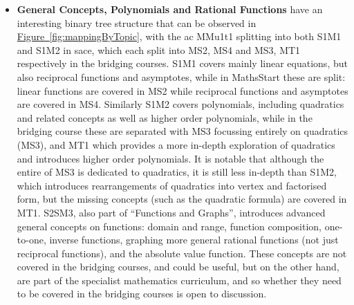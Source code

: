 \documentclass[twoside,12pt,a4paper]{report}
\newcommand{\reffig}[1]{\hyperref[fig:#1]{Figure~\ref{fig:#1}}}
\begin{document}
\begin{itemize} 
	\item \textbf{General Concepts, Polynomials and Rational Functions} have an interesting binary tree structure that can be observed in \reffig{mappingByTopic}, with the \gls{ac} MMu1t1 splitting into both S1M1 and S1M2 in \gls{sace}, which each split into MS2, MS4 and MS3, MT1 respectively in the bridging courses. S1M1 covers mainly linear equations, but also reciprocal functions and asymptotes, while in MathsStart these are split: linear functions are covered in MS2 while reciprocal functions and asymptotes are covered in MS4. Similarly S1M2 covers polynomials, including quadratics and related concepts as well as higher order polynomials, while in the bridging course these are separated with MS3 focussing entirely on quadratics (MS3), and MT1 which provides a more in-depth exploration of quadratics and introduces higher order polynomials. It is notable that although the entire of MS3 is dedicated to quadratics, it is still less in-depth than S1M2, which introduces rearrangements of quadratics into vertex and factorised form, but the missing concepts (such as the quadratic formula) are covered in MT1. S2SM3, also part of ``Functions and Graphs'', introduces advanced general concepts on functions: domain and range, function composition, one-to-one, inverse functions, graphing more general rational functions (not just reciprocal functions), and the absolute value function. These concepts are not covered in the bridging courses, and could be useful, but on the other hand, are part of the specialist mathematics curriculum, and so whether they need to be covered in the bridging courses is open to discussion.

\end{itemize}
\end{document}
